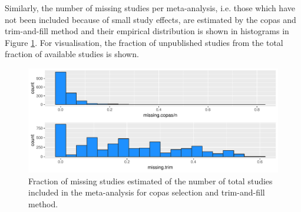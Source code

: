\documentclass[11pt,a4paper,twoside]{book}\usepackage[]{graphicx}\usepackage[]{color}
\newenvironment{knitrout}{}{} %
\begin{document}
Similarly, the number of missing studies per meta-analysis, i.e. those which have not been included because of small study effects, are estimated by the copas and trim-and-fill method and their empirical distribution is shown in histograms in Figure \ref{missing.studies.distribution}. For visualisation, the fraction of unpublished studies from the total fraction of available studies is shown.

\begin{figure}
\begin{knitrout}
\color{fgcolor}

{\centering \includegraphics[width=\textwidth-3cm]{figure/ch02_figunnamed-chunk-34-1} 

}



\end{knitrout}
\caption{Fraction of missing studies estimated of the number of total studies included in the meta-analysis for copas selection and trim-and-fill method.}
\label{missing.studies.distribution}
\end{figure}








\end{document}

